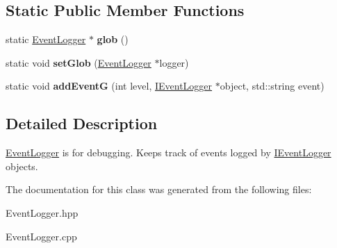 \subsection*{Static Public Member Functions}
\begin{DoxyCompactItemize}
\item 
\hypertarget{classLogger_1_1EventLogger_a9a4a948fbe302ad0cc7376725d4a1c5b}{
static \hyperlink{classLogger_1_1EventLogger}{EventLogger} $\ast$ {\bfseries glob} ()}
\label{classLogger_1_1EventLogger_a9a4a948fbe302ad0cc7376725d4a1c5b}

\item 
\hypertarget{classLogger_1_1EventLogger_a62f3ab4b10a9d804606cd62193e09716}{
static void {\bfseries setGlob} (\hyperlink{classLogger_1_1EventLogger}{EventLogger} $\ast$logger)}
\label{classLogger_1_1EventLogger_a62f3ab4b10a9d804606cd62193e09716}

\item 
\hypertarget{classLogger_1_1EventLogger_a0033da67870e179d920672a43da8b0f2}{
static void {\bfseries addEventG} (int level, \hyperlink{classLogger_1_1IEventLogger}{IEventLogger} $\ast$object, std::string event)}
\label{classLogger_1_1EventLogger_a0033da67870e179d920672a43da8b0f2}

\end{DoxyCompactItemize}


\subsection{Detailed Description}
\hyperlink{classLogger_1_1EventLogger}{EventLogger} is for debugging. Keeps track of events logged by \hyperlink{classLogger_1_1IEventLogger}{IEventLogger} objects. 

The documentation for this class was generated from the following files:\begin{DoxyCompactItemize}
\item 
EventLogger.hpp\item 
EventLogger.cpp\end{DoxyCompactItemize}
